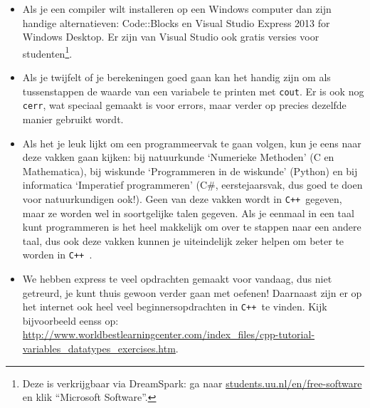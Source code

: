 \documentclass[12pt,a4paper]{article}
\newcommand{\icode}{\lstinline}
\newcommand{\mono}{\texttt}
\newcommand{\cpp}{\mono{C++ }}
\begin{document}
\begin{itemize}
	\item Als je een compiler wilt installeren op een Windows computer dan zijn handige alternatieven: Code::Blocks en Visual Studio Express 2013 for Windows Desktop. Er zijn van Visual Studio ook gratis versies voor studenten\footnote{Deze is verkrijgbaar via DreamSpark: ga naar \url{students.uu.nl/en/free-software} en klik ``Microsoft Software''.}.
	\item Als je twijfelt of je berekeningen goed gaan kan het handig zijn om als tussenstappen de waarde van een variabele te printen met \icode{cout}. Er is ook nog \icode{cerr}, wat speciaal gemaakt is voor errors, maar verder op precies dezelfde manier gebruikt wordt.
	\item Als het je leuk lijkt om een programmeervak te gaan volgen, kun je eens naar deze vakken gaan kijken: bij natuurkunde `Numerieke Methoden' (C en Mathematica), bij wiskunde `Programmeren in de wiskunde' (Python) en bij informatica `Imperatief programmeren' (C\#, eerstejaarsvak, dus goed te doen voor natuurkundigen ook!). Geen van deze vakken wordt in \cpp gegeven, maar ze worden wel in soortgelijke talen gegeven. Als je eenmaal in een taal kunt programmeren is het heel makkelijk om over te stappen naar een andere taal, dus ook deze vakken kunnen je uiteindelijk zeker helpen om beter te worden in \cpp. 
	\item We hebben express te veel opdrachten gemaakt voor vandaag, dus niet getreurd, je kunt thuis gewoon verder gaan met oefenen! Daarnaast zijn er op het internet ook heel veel beginnersopdrachten in \cpp te vinden. Kijk bijvoorbeeld eenss op: \url{http://www.worldbestlearningcenter.com/index_files/cpp-tutorial-variables_datatypes_exercises.htm}.
\end{itemize}
\end{document}
